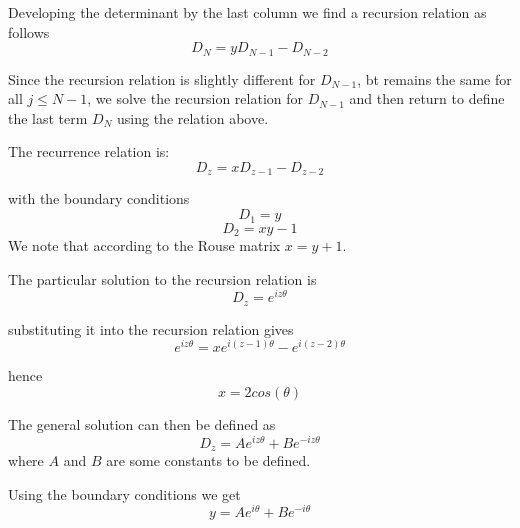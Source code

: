 \documentclass{report}
\begin{document}
Developing the determinant by the last column we find a recursion relation as follows 
\begin{equation*}
D_N = yD_{N-1}-D_{N-2}
\end{equation*}

Since the recursion relation is slightly different for $D_{N-1}$, bt remains the same for all $j\leq N-1$, we solve the recursion relation for $D_{N-1}$ and then return to define the last term $D_N$ using the relation above. 

The recurrence relation is:
\begin{equation*}
D_z = xD_{z-1}-D_{z-2}
\end{equation*}

with the boundary conditions
\begin{equation*}
D_1 = y 
\end{equation*}
\begin{equation*}
D_2 = xy-1
\end{equation*}
We note that according to the Rouse matrix $x=y+1$.

The particular solution to the recursion relation is 
\begin{equation*}
D_z=e^{iz\theta}
\end{equation*}

substituting it into the recursion relation gives
\begin{equation*}
e^{iz\theta}=xe^{i(z-1)\theta}-e^{i(z-2)\theta}
\end{equation*}

hence
\begin{equation*}
x=2cos(\theta)
\end{equation*}

The general solution can then be defined as 
\begin{equation*}
D_z=Ae^{iz\theta}+Be^{-iz\theta}
\end{equation*}
where $A$ and $B$ are some constants to be defined.

 Using the boundary conditions we get 
 \begin{equation*}
 y = Ae^{i\theta}+Be^{-i\theta}
 \end{equation*}
 
\end{document}

